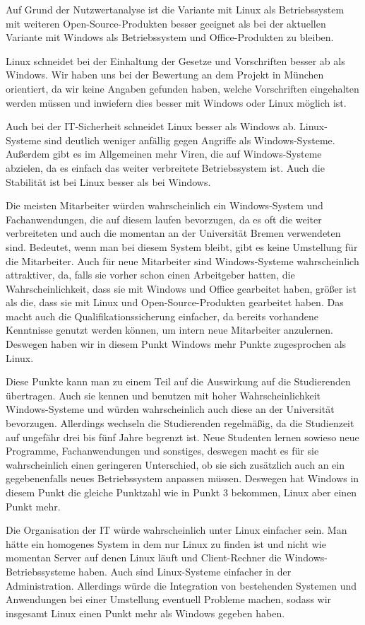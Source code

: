 \documentclass[12pt,utf8]{scrartcl}
\begin{document}
Auf Grund der Nutzwertanalyse ist die Variante mit Linux als Betriebssystem mit weiteren Open-Source-Produkten besser geeignet als bei der aktuellen Variante mit Windows als Betriebssystem und Office-Produkten zu bleiben. 

Linux schneidet bei der Einhaltung der Gesetze und Vorschriften besser ab als Windows. Wir haben uns bei der Bewertung an dem Projekt in München orientiert, da wir keine Angaben gefunden haben, welche Vorschriften eingehalten werden müssen und inwiefern dies besser mit Windows oder Linux möglich ist.

Auch bei der IT-Sicherheit schneidet Linux besser als Windows ab. Linux-Systeme sind deutlich weniger anfällig gegen Angriffe als Windows-Systeme. Außerdem gibt es im Allgemeinen mehr Viren, die auf Windows-Systeme abzielen, da es einfach das weiter verbreitete Betriebssystem ist. Auch die Stabilität ist bei Linux besser als bei Windows.

Die meisten Mitarbeiter würden wahrscheinlich ein Windows-System und Fachanwendungen, die auf diesem laufen bevorzugen, da es oft die weiter verbreiteten und auch die momentan an der Universität Bremen verwendeten sind. Bedeutet, wenn man bei diesem System bleibt, gibt es keine Umstellung für die Mitarbeiter. Auch für neue Mitarbeiter sind Windows-Systeme wahrscheinlich attraktiver, da, falls sie vorher schon einen Arbeitgeber hatten, die Wahrscheinlichkeit, dass sie mit Windows und Office gearbeitet haben, größer ist als die, dass sie mit Linux und Open-Source-Produkten gearbeitet haben. Das macht auch die Qualifikationssicherung einfacher, da bereits vorhandene Kenntnisse genutzt werden können, um intern neue Mitarbeiter anzulernen. Deswegen haben wir in diesem Punkt Windows mehr Punkte zugesprochen als Linux. 

Diese Punkte kann man zu einem Teil auf die Auswirkung auf die Studierenden übertragen. Auch sie kennen und benutzen mit hoher Wahrscheinlichkeit Windows-Systeme und würden wahrscheinlich auch diese an der Universität bevorzugen. Allerdings wechseln die Studierenden regelmäßig, da die Studienzeit auf ungefähr drei bis fünf Jahre begrenzt ist. Neue Studenten lernen sowieso neue Programme, Fachanwendungen und sonstiges, deswegen macht es für sie wahrscheinlich einen geringeren Unterschied, ob sie sich zusätzlich auch an ein gegebenenfalls neues Betriebssystem anpassen müssen. Deswegen hat Windows in diesem Punkt die gleiche Punktzahl wie in Punkt 3 bekommen, Linux aber einen Punkt mehr. 

Die Organisation der IT würde wahrscheinlich unter Linux einfacher sein. Man hätte ein homogenes System in dem nur Linux zu finden ist und nicht wie momentan Server auf denen Linux läuft und Client-Rechner die Windows-Betriebssysteme haben. Auch sind Linux-Systeme einfacher in der Administration. Allerdings würde die Integration von bestehenden Systemen und Anwendungen bei einer Umstellung eventuell Probleme machen, sodass wir insgesamt Linux einen Punkt mehr als Windows gegeben haben.
\end{document}
